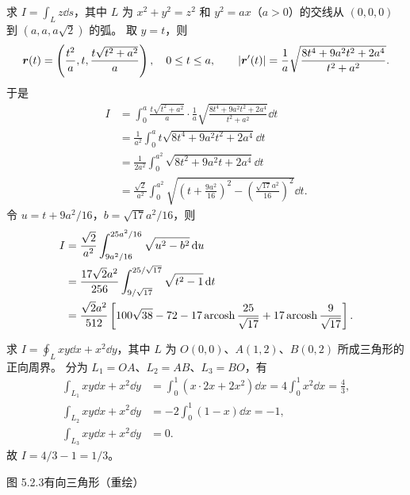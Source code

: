 求 $I=\int_Lz\dd s$，其中 $L$ 为 $x^2+y^2=z^2$ 和 $y^2=ax$（$a>0$）的交线从 $(0,0,0)$ 到 $(a,a,a\sqrt2)$ 的弧。
\sol 取 $y=t$，则
\[
\bm{r}(t)=\left(\frac{t^2}{a},t,\frac{t\sqrt{t^2+a^2}}{a}\right),\quad 0\le t\le a,
\qquad |\bm{r}'(t)|=\frac1a\sqrt{\frac{8t^4+9a^2t^2+2a^4}{t^2+a^2}}.
\]
于是
\begin{align*}
I&=\int_0^a\frac{t\sqrt{t^2+a^2}}a\cdot\frac1a\sqrt{\frac{8t^4+9a^2t^2+2a^4}{t^2+a^2}}\dd t\\
&=\frac1{a^2}\int_0^at\sqrt{8t^4+9a^2t^2+2a^4}\dd t\\
&=\frac1{2a^2}\int_0^{a^2}\sqrt{8t^2+9a^2t+2a^4}\dd t\\
&=\frac{\sqrt2}{a^2}\int_0^{a^2}\sqrt{\left(t+\frac{9a^2}{16}\right)^2-\left(\frac{\sqrt{17}a^2}{16}\right)^2}\dd t.
\end{align*}
令 $u=t+9a^2/16$，$b=\sqrt{17}a^2/16$，则
\begin{align*}
I&=\frac{\sqrt2}{a^2}\int_{9a^2/16}^{25a^2/16}\sqrt{u^2-b^2}\mathop{}\!\mathrm d u\\
&=\frac{17\sqrt2a^2}{256}\int_{9/\sqrt{17}}^{25/\sqrt{17}}\sqrt{t^2-1}\mathop{}\!\mathrm d t\\
&=\frac{\sqrt2a^2}{512}\left[100\sqrt{38}-72-17\operatorname{arcosh}\frac{25}{\sqrt{17}}+17\operatorname{arcosh}\frac9{\sqrt{17}}\right].
\end{align*}

求 $I=\oint_Lxy\dd x+x^2\dd y$，其中 $L$ 为 $O(0,0)$、$A(1,2)$、$B(0,2)$ 所成三角形的正向周界。
\sol 分为 $L_1=OA$、$L_2=AB$、$L_3=BO$，有
\begin{align*}
\int_{L_1}xy\dd x+x^2\dd y&=\int_0^1(x\cdot2x+2x^2)\dd x=4\int_0^1x^2\dd x=\frac43,\\
\int_{L_2}xy\dd x+x^2\dd y&=-2\int_0^1(1-x)\dd x=-1,\\
\int_{L_3}xy\dd x+x^2\dd y&=0.
\end{align*}
故 $I=4/3-1=1/3$。
\begin{center}\begin{minipage}{\linewidth}\centering
{}\par{\small 图 5.2.3\quad 有向三角形（重绘）}
\end{minipage}\end{center}

